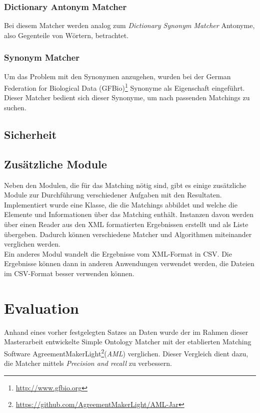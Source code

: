 		\subsubsection{Dictionary Antonym Matcher}
		Bei diesem Matcher werden analog zum \textit{Dictionary Synonym Matcher}
		Antonyme, also Gegenteile von Wörtern, betrachtet.
		
		\subsubsection{Synonym Matcher}
		Um das Problem mit den Synonymen anzugehen, wurden bei der German Federation
		for Biological Data (GFBio)\footnote{\url{http://www.gfbio.org}} Synonyme als
		Eigenschaft eingeführt. Dieser Matcher bedient sich dieser Synonyme, um nach passenden
		Matchings zu suchen.
		
		\subsection{Sicherheit}
		
		
		\subsection{Zusätzliche Module}
		Neben den Modulen, die für das Matching nötig sind, gibt es einige zusätzliche
		Module zur Durchführung verschiedener Aufgaben mit den Resultaten.\\
		Implementiert wurde eine Klasse, die die Matchings abbildet und welche die
		Elemente und Informationen über das Matching enthält. Instanzen davon werden
		über einen Reader aus den XML formatierten Ergebnissen erstellt und als Liste
		übergeben. Dadurch können verschiedene Matcher und Algorithmen miteinander
		verglichen werden.\\
		Ein anderes Modul wandelt die Ergebnisse vom XML-Format in CSV. Die Ergebnisse
		können dann in anderen Anwendungen verwendet werden, die Dateien im CSV-Format
		besser verwenden können.
		
		\section{Evaluation}
		Anhand eines vorher festgelegten Satzes an Daten wurde der im Rahmen dieser
		Masterarbeit entwickelte Simple Ontology Matcher mit der etablierten Matching
		Software
		AgreementMakerLight\footnote{\url{https://github.com/AgreementMakerLight/AML-Jar}}(\textit{AML})
		verglichen. Dieser Vergleich dient dazu, die Matcher mittels \textit{Precision
		and recall} zu verbessern.
		
